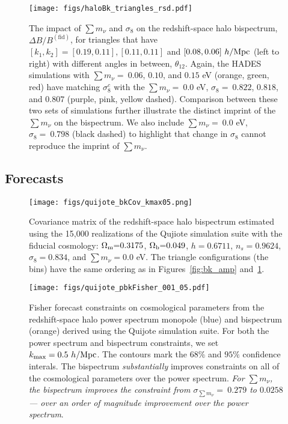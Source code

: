 \documentclass[12pt, letterpaper, preprint]{aastex62}
\newcommand{\Om}{\Omega_{\rm m}}
\newcommand{\Ob}{\Omega_{\rm b}}
\newcommand{\smnu}{\sum m_\nu}
\newcommand{\sig}{\sigma_8}
\begin{document}
\begin{figure}
\begin{center}
\texttt{[image: figs/haloBk\_triangles\_rsd.pdf]}
    \caption{The impact of $\smnu$ and $\sig$ on the redshift-space halo 
    bispectrum, $\Delta B/B^\mathrm{(fid)}$, for triangles that have  
    $[k_1, k_2] = [0.19, 0.11], [0.11, 0.11]$ and $[0.08, 0.06]~h/{\rm Mpc}$ 
    (left to right) with different angles in between, $\theta_{12}$. Again, 
    the HADES simulations with $\smnu{=}~0.06$, $0.10$, and $0.15$ eV 
    (orange, green, red) have matching $\sig^{c}$ with the $\smnu{=}~0.0$ eV, 
    $\sig{=}~0.822$, $0.818$, and $0.807$ (purple, pink, yellow dashed). Comparison
    between  these two sets of simulations further illustrate the distinct 
    imprint of the $\smnu$ on the bispectrum. We also include $\smnu{=}~0.0$ eV, 
    $\sig{=}~0.798$ (black dashed) to highlight that change in $\sig$ cannot 
    reproduce the imprint of $\smnu$. 
    }
\label{fig:dbk_amp}
\end{center}
\end{figure}

\subsection{Forecasts} \label{sec:forecasts}

\begin{figure}
\begin{center}
    \texttt{[image: figs/quijote\_bkCov\_kmax05.png]} 
    \caption{Covariance matrix of the redshift-space halo bispectrum estimated 
    using the 15,000 realizations of the Qujiote simulation suite with the 
    fiducial cosmology: $\Om{=}0.3175$, $\Ob{=}0.049$, $h{=}0.6711$, $n_s{=}0.9624$, $\sig{=}0.834$, 
    and $\smnu{=}0.0$ eV. The triangle configurations (the bins) have the same 
    ordering as in Figures~\ref{fig:bk_amp} and~\ref{fig:dbk_amp}.
    }
\label{fig:bk_cov}
\end{center}
\end{figure}

\begin{figure}
\begin{center}
    \texttt{[image: figs/quijote\_pbkFisher\_001\_05.pdf]}
    \caption{Fisher forecast constraints on cosmological parameters from the 
    redshift-space halo power spectrum monopole (blue) and bispectrum (orange) 
    derived using the Quijote simulation suite. For both the power spectrum 
    and bispectrum constraints, we set $k_{\rm max} = 0.5~h/{\rm Mpc}$. The 
    contours mark the $68\%$ and $95\%$ confidence interals. The bispectrum 
    {\em substantially} improves constraints on all of the cosmological parameters 
    over the power spectrum. {\em For $\smnu$, the bispectrum improves the constraint
    from $\sigma_{\smnu}{=}~0.279$ to $0.0258$ --- over an order of magnitude 
    improvement over the power spectrum}.}
\label{fig:bk_fish}
\end{center}
\end{figure}
\end{document}
